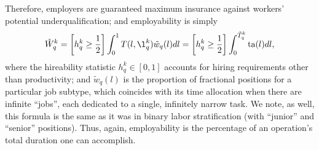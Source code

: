 \documentclass[hidelinks, nonatbib]{elsarticle}
\begin{document}
Therefore, employers are guaranteed maximum insurance against workers' potential underqualification; and employability is simply
\begin{gather}
\tilde{W}_{q}^{k} 
= 
\left[
    h_{q}^{k}
    \geq
    \frac{1}{2}
\right]
\int_{0}^{1}
T(l, \l_{q}^{k})
\tilde{w}_{q}(l)
dl
= 
\left[
    h_{q}^{k}
    \geq
    \frac{1}{2}
\right]
\int_{0}^{\tilde{T}_{q}^{k}}
\text{ta}(l)
dl
,
\end{gather}
where the hireability statistic $h_{q}^{k} \in [0,1]$ accounts for hiring requirements other than productivity; and $\tilde{w}_{q}(l)$ is the proportion of fractional positions for a particular job subtype, which coincides with its time allocation when there are infinite ``jobs'', each dedicated to a single, infinitely narrow task. We note, as well, this formula is the same as it was in binary labor stratification (with ``junior'' and ``senior'' positions). Thus, again, employability is the percentage of an operation's total duration one can accomplish. 
\end{document}
